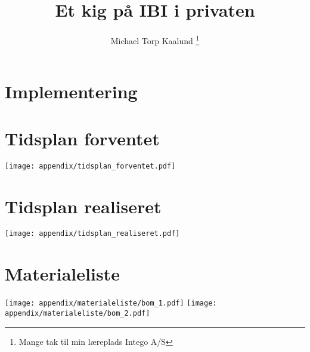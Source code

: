 \documentclass[12pt,a4paper,twoside]{article}
\title{Et kig på IBI i privaten}
\author{Michael Torp Kaalund \thanks{Mange tak til min læreplads Intego A/S}}
\begin{document}
  
    





    \tableofcontents

    

    \section{Implementering}
        
        
        

  

    \appendix
       
    \section{Tidsplan forventet} \label{sec:tidsplan_forventet}
    \texttt{[image: appendix/tidsplan\_forventet.pdf]}
    \section{Tidsplan realiseret} \label{sec:tidsplan_realiseret}
    \texttt{[image: appendix/tidsplan\_realiseret.pdf]}
    \section{Materialeliste} 
    \texttt{[image: appendix/materialeliste/bom\_1.pdf]}
    \newpage
    \texttt{[image: appendix/materialeliste/bom\_2.pdf]}
    
    
    
    
%    
\end{document}
